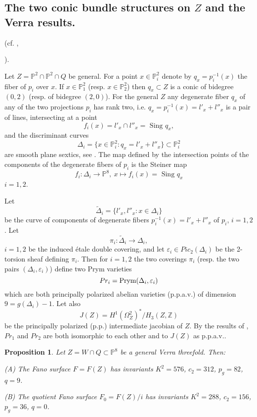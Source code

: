 \documentclass[a4paper,11pt]{amsart}
\newtheorem{prop}[thm]{Proposition}
\theoremstyle{definition}
\numberwithin{equation}{section}
\numberwithin{equation}{section} \theoremstyle{definition}
\begin{document}
\subsection{ The two conic bundle structures on $Z$ and the Verra results.}
(cf. \cite{Vera}, {\cite{Iliev}). 

Let $Z =  {{\mathbb{P}}}^2\cap {{\mathbb{P}}}^2 \cap Q$ be general. 
For a point $x \in {{\mathbb{P}}}^2_i$ denote by 
$q_x = p_i^{-1}(x)$ the fiber of $p_i$ over $x$.
If $x \in {{\mathbb{P}}}^2_1$ (resp. $x \in {{\mathbb{P}}}^2_2$) 
then $q_x \subset Z$ is a conic of bidegree $(0,2)$
(resp. of bidegree $(2,0)$). For the general $Z$ any 
degenerate fiber $q_x$ of any of the two projections 
$p_i$ has rank two, i.e. $q_x = p_i^{-1}(x) = l'_x + l''_x$ 
is a pair of lines, intersecting at a point 
$$f_i(x) = l'_x \cap l''_x = \mbox{ Sing } q_x,$$  
and the discriminant curves 
$$
\Delta_i = \{ x \in {{\mathbb{P}}}^2_i: q_x = l'_x + l''_x \} \subset {{\mathbb{P}}}^2_i
$$
are smooth plane sextics, see \cite{Vera}.  
The map defined by the intersection points of the components of the 
degenerate fibers of $p_i$ is 
the Steiner map
$$
f_i: \Delta_i \rightarrow  {{\mathbb{P}}}^8, \ 
x \mapsto f_i(x) = \mbox{ Sing } q_x
$$
$i = 1,2$. 

Let 
$$\tilde{\Delta}_i = \{ l'_x,l''_x : x \in \Delta_i \}$$
be the curve of components of degenerate fibers $p_i^{-1}(x) = l'_x + l''_x$ 
of $p_i$, $i = 1,2$. Let 
$$
\pi_i: \tilde{\Delta}_i \rightarrow \Delta_i,
$$
$i = 1,2$ be the induced \'etale double covering,
and let $\varepsilon_i \in Pic_2(\Delta_i)$ be the 
2-torsion sheaf defining $\pi_i$. Then for $i = 1,2$ 
the two coverings $\pi_i$ (resp. the two pairs $(\Delta_i,\varepsilon_i)$)
define two Prym varieties 
$$
Pr_i = {\rm Prym}(\Delta_i,\varepsilon_i)
$$ 
which are both principally polarized abelian varieties (p.p.a.v.) 
of dimension $9 = g(\Delta_i) - 1$. 
Let also 
$$
J(Z) = H^1(\Omega^2_Z)^*/H_3(Z,{\mathbb{Z}})
$$
be the principally polarized (p.p.) intermediate jacobian of $Z$. 
By the results of \cite{Vera}, $Pr_1$ and $Pr_2$ are both 
isomorphic to each other and to $J(Z)$ as p.p.a.v..

\begin{prop}\label{3-2}
Let $Z = W \cap Q \subset {{\mathbb{P}}}^8$ be a general Verra threefold. 
Then:  

(A) The Fano surface $F = F(Z)$ has invariants 
$K^2 = 576$, $c_2 = 312$, 
$p_g = 82$, $q = 9$.   

(B) The quotient Fano surface $F_0 = F(Z)/i$ has invariants 
$K^2 = 288$, $c_2 = 156$, 
$p_g = 36$, $q = 0$.   
\end{prop}

}
\end{document}
